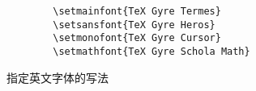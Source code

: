 \begin{listing}[H]
    \begin{verbatim}
        \setmainfont{TeX Gyre Termes}
        \setsansfont{TeX Gyre Heros}
        \setmonofont{TeX Gyre Cursor}
        \setmathfont{TeX Gyre Schola Math}
    \end{verbatim}
    \caption{指定英文字体的写法}
\end{listing}

\iffalse
\section{后续内容}
\subsection{富强民主}
\zhlipsum[3]
\fi